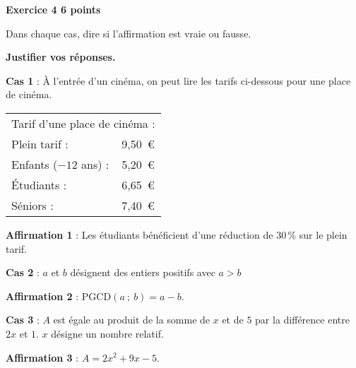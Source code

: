 \textbf{Exercice 4 \hfill 6 points}

\medskip

Dans chaque cas, dire si l'affirmation est vraie ou fausse. 

\textbf{Justifier vos réponses.}

\medskip
 
\textbf{Cas 1 }: À l'entrée d'un cinéma, on peut lire les tarifs ci-dessous pour une place de cinéma.

\begin{center}
\begin{tabularx}{0.45\linewidth}{|l X|}\hline
\multicolumn{2}{|c|}{Tarif d'une place de cinéma :}\\ 
Plein tarif :			& 9,50~\euro\\ 
Enfants ($- 12$ ans) :	& 5,20~\euro\\
Étudiants :				& 6,65~\euro \\
Séniors :				& 7,40~\euro \\\hline
\end{tabularx}
\end{center}
  
\textbf{Affirmation 1 }: Les étudiants bénéficient d'une réduction de 30\,\% sur le plein tarif.

\medskip
 
\textbf{Cas 2 }: $a$ et $b$ désignent des entiers positifs avec $a > b$ 

\textbf{Affirmation 2 } : PGCD$(a~;~b) = a - b$.

\medskip
 
\textbf{Cas 3 }: $A$ est égale au produit de la somme de $x$ et de $5$ par la différence entre $2x$ et $1$. $x$ désigne un nombre relatif. 

\textbf{Affirmation 3 }: $A = 2x^2 + 9x - 5$. 

\bigskip

